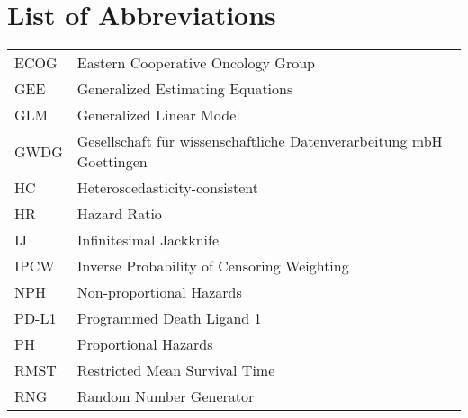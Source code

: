 \section*{List of Abbreviations}

\begin{tabular}{@{} l @{\hskip 1in} l}
  ECOG & Eastern Cooperative Oncology Group \\
  GEE & Generalized Estimating Equations \\
  GLM & Generalized Linear Model \\
  GWDG & Gesellschaft für wissenschaftliche Datenverarbeitung mbH Goettingen \\
  HC & Heteroscedasticity-consistent \\
  HR & Hazard Ratio \\
  IJ & Infinitesimal Jackknife \\
  IPCW & Inverse Probability of Censoring Weighting \\
  NPH & Non-proportional Hazards \\
  PD-L1 & Programmed Death Ligand 1 \\
  PH & Proportional Hazards \\
  RMST & Restricted Mean Survival Time \\
  RNG & Random Number Generator \\
\end{tabular}
